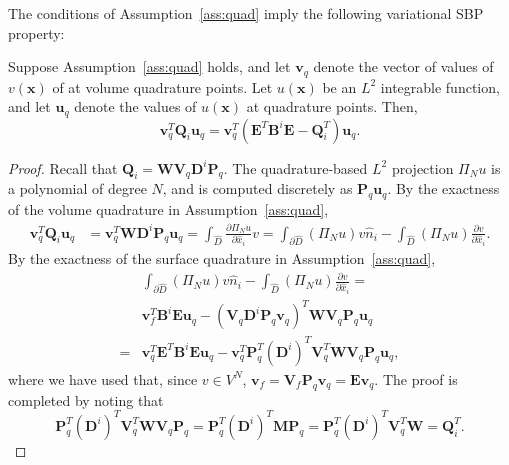 \documentclass[review]{siamart0216}
\theoremstyle{assumption}
\renewcommand{\hat}[1]{\hat{#1}}
\newcommand{\pd}[2]{\frac{\partial#1}{\partial#2}}
\newcommand{\LRp}[1]{\left( #1 \right)}
\renewcommand{\hat}{\widehat}
\begin{document}

The conditions of Assumption~\ref{ass:quad} imply the following variational SBP property:
\begin{lemma}
\label{lemma:vsbp}
Suppose Assumption~\ref{ass:quad} holds, and let $\bm{v}_q$ denote the vector of values of $v(\bm{x})$ of at volume quadrature points. Let $u(\bm{x})$ be an $L^2$ integrable function, and let $\bm{u}_q$ denote the values of $u(\bm{x})$ at quadrature points.  Then, 
\[
\bm{v}_q^T\bm{Q}_i \bm{u}_q = \bm{v}_q^T\LRp{ {\bm{E}}^T \bm{B}^i\bm{E} - \bm{Q}_i^T}\bm{u}_q.
\]
\end{lemma}
\begin{proof}
Recall that $\bm{Q}_i = \bm{W} \bm{V}_q \bm{D}^i\bm{P}_q$.  The quadrature-based $L^2$ projection $\Pi_Nu$ is a polynomial of degree $N$, and is computed discretely as $\bm{P}_q\bm{u}_q$.  By the exactness of the volume quadrature in Assumption~\ref{ass:quad}, 
\begin{align*}
\bm{v}_q^T\bm{Q}_i \bm{u}_q &= \bm{v}_q^T\bm{W} \bm{D}^i \bm{P}_q \bm{u}_q = \int_{\hat{D}} \pd{\Pi_N u}{\hat{x}_i} v = \int_{\partial \hat{D}} (\Pi_N u) v \hat{n}_i - \int_{\hat{D}} \LRp{\Pi_N u} \pd{v}{\hat{x}_i}.
\end{align*}
By the exactness of the surface quadrature in Assumption~\ref{ass:quad}, 
\begin{align*}
&\int_{\partial \hat{D}} (\Pi_N u) v \hat{n}_i -   \int_{\hat{D}} \LRp{\Pi_N u} \pd{v}{\hat{x}_i} =\\
 &\bm{v}_f^T\bm{B}^i \bm{E}\bm{u}_q - \LRp{\bm{V}_q\bm{D}^i\bm{P}_q\bm{v}_q}^T\bm{W} \bm{V}_q\bm{P}_q\bm{u}_q\\
=& \bm{v}_q^T {\bm{E}}^T\bm{B}^i \bm{E}\bm{u}_q - \bm{v}_q^T \bm{P}_q^T\LRp{\bm{D}^i}^T \bm{V}_q^T \bm{W} \bm{V}_q\bm{P}_q\bm{u}_q,
\end{align*}
where we have used that, since $v \in V^N$, $\bm{v}_f = \bm{V}_f\bm{P}_q\bm{v}_q = \bm{E}\bm{v}_q$.  The proof is completed by noting that 
\[
\bm{P}_q^T\LRp{\bm{D}^i}^T \bm{V}_q^T \bm{W} \bm{V}_q\bm{P}_q = \bm{P}_q^T\LRp{\bm{D}^i}^T \bm{M}\bm{P}_q = \bm{P}_q^T\LRp{\bm{D}^i}^T \bm{V}_q^T\bm{W} = \bm{Q}_i^T.
\]
\end{proof}
\end{document}
